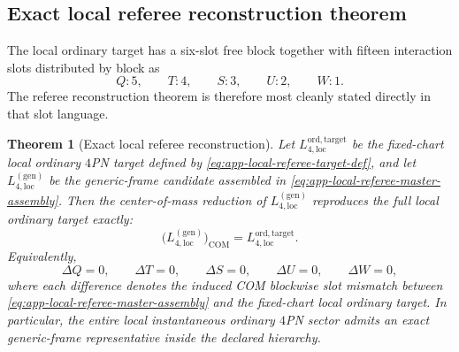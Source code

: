 \documentclass[11pt]{article}
\newtheorem{theorem}{Theorem}
\begin{document}
\subsection{Exact local referee reconstruction theorem}
\label{app:local-referee-reconstruction-theorem}

The local ordinary target has a six-slot free block together with fifteen
interaction slots distributed by block as
\begin{equation}
Q:5,
\qquad
T:4,
\qquad
S:3,
\qquad
U:2,
\qquad
W:1.
\label{eq:app-local-referee-slot-counts}
\end{equation}
The referee reconstruction theorem is therefore most cleanly stated directly in
that slot language.

\begin{theorem}[Exact local referee reconstruction]
\label{thm:app-local-referee-reconstruction}
Let $L_{4,\mathrm{loc}}^{\mathrm{ord,target}}$ be the fixed-chart local ordinary
$4$PN target defined by \eqref{eq:app-local-referee-target-def}, and let
$L_{4,\mathrm{loc}}^{(\mathrm{gen})}$ be the generic-frame candidate assembled in
\eqref{eq:app-local-referee-master-assembly}.  Then the center-of-mass reduction
of $L_{4,\mathrm{loc}}^{(\mathrm{gen})}$ reproduces the full local ordinary target
exactly:
\begin{equation}
\bigl(L_{4,\mathrm{loc}}^{(\mathrm{gen})}\bigr)_{\mathrm{COM}}
=
L_{4,\mathrm{loc}}^{\mathrm{ord,target}}.
\label{eq:app-local-referee-reconstruction-identity}
\end{equation}
Equivalently,
\begin{equation}
\Delta Q=0,
\qquad
\Delta T=0,
\qquad
\Delta S=0,
\qquad
\Delta U=0,
\qquad
\Delta W=0,
\label{eq:app-local-referee-blockwise-zero}
\end{equation}
where each difference denotes the induced COM blockwise slot mismatch between
\eqref{eq:app-local-referee-master-assembly} and the fixed-chart local ordinary
target.  In particular, the entire local instantaneous ordinary $4$PN sector
admits an exact generic-frame representative inside the declared hierarchy.
\end{theorem}
\end{document}
